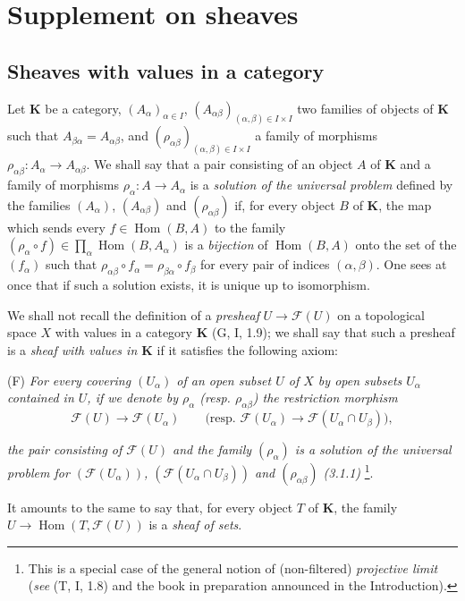 \section{Supplement on sheaves}
\label{section:0.3}

\subsection{Sheaves with values in a category}
\label{subsection:0.3.1}

\begin{env}[3.1.1]
\label{0.3.1.1}
Let $\boldsymbol{K}$ be a category, $(A_\alpha)_{\alpha\in I}$,
$(A_{\alpha\beta})_{(\alpha,\beta)\in I\times I}$ two families of objects of
$\boldsymbol{K}$ such that $A_{\beta\alpha}=A_{\alpha\beta}$, and
$(\rho_{\alpha\beta})_{(\alpha,\beta)\in I\times I}$ a family of morphisms
$\rho_{\alpha\beta}:A_\alpha\to A_{\alpha\beta}$. We shall say that a pair
consisting of an object $A$ of $\boldsymbol{K}$ and a family of morphisms
$\rho_\alpha:A\to A_\alpha$ is a \emph{solution of the universal problem} defined
by the families $(A_\alpha)$, $(A_{\alpha\beta})$ and
$(\rho_{\alpha\beta})$ if, for every object $B$ of $\boldsymbol{K}$, the map
which sends every $f\in\operatorname{Hom}(B,A)$ to the family
$(\rho_\alpha\circ f)\in\prod_\alpha\operatorname{Hom}(B,A_\alpha)$ is a
\emph{bijection} of $\operatorname{Hom}(B,A)$ onto the set of the $(f_\alpha)$
such that
$\rho_{\alpha\beta}\circ f_\alpha=\rho_{\beta\alpha}\circ f_\beta$ for every
pair of indices $(\alpha,\beta)$. One sees at once that if such a
solution exists, it is unique up to isomorphism.
\end{env}

\begin{env}[3.1.2]
\label{0.3.1.2}
We shall not recall the definition of a \emph{presheaf}
$U\to\mathcal{F}(U)$ on a topological space $X$ with values in a
category $\boldsymbol{K}$ (G, I, 1.9); we shall say that such a presheaf is a
\emph{sheaf with values in $\boldsymbol{K}$} if it satisfies the following
axiom:

\smallskip
\noindent
\textup{(F)} \emph{For every covering $(U_\alpha)$ of an open subset $U$ of $X$
by open subsets $U_\alpha$ contained in $U$, if we denote by $\rho_\alpha$
\textup{(resp. $\rho_{\alpha\beta}$)} the restriction morphism}
\[
  \mathcal{F}(U)\to\mathcal{F}(U_\alpha)
  \qquad
  \bigl(\text{resp. }\mathcal{F}(U_\alpha)
  \to\mathcal{F}(U_\alpha\cap U_\beta)\bigr),
\]


\emph{the pair consisting of $\mathcal{F}(U)$ and the family $(\rho_\alpha)$ is a
solution of the universal problem for $(\mathcal{F}(U_\alpha))$,
$(\mathcal{F}(U_\alpha\cap U_\beta))$ and $(\rho_{\alpha\beta})$ \textup{(3.1.1)}}%
\footnote{This is a special case of the general notion of (non-filtered)
\emph{projective limit} (\emph{see} (T, I, 1.8) and the book in preparation
announced in the Introduction).}.

It amounts to the same to say that, for every object $T$ of $\boldsymbol{K}$, the
family $U\to\operatorname{Hom}(T,\mathcal{F}(U))$ is a \emph{sheaf
of sets}.
\end{env}

